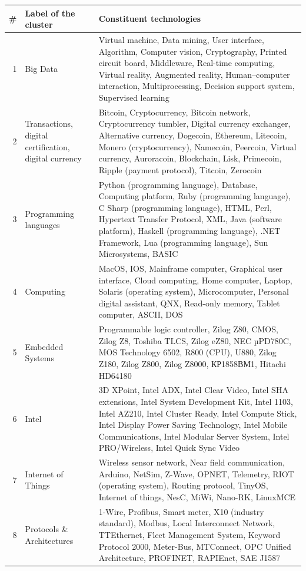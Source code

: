 \documentclass[]{book}
\begin{document}
\begin{tabular}{r|l|l}
\hline
\# & Label of the cluster & Constituent technologies\\
\hline
1 & Big Data & Virtual machine, Data mining, User interface, Algorithm, Computer vision, Cryptography, Printed circuit board, Middleware, Real-time computing, Virtual reality, Augmented reality, Human–computer interaction, Multiprocessing, Decision support system, Supervised learning\\
\hline
2 & Transactions, digital certification, digital currency & Bitcoin, Cryptocurrency, Bitcoin network, Cryptocurrency tumbler, Digital currency exchanger, Alternative currency, Dogecoin, Ethereum, Litecoin, Monero (cryptocurrency), Namecoin, Peercoin, Virtual currency, Auroracoin, Blockchain, Lisk, Primecoin, Ripple (payment protocol), Titcoin, Zerocoin\\
\hline
3 & Programming languages & Python (programming language), Database, Computing platform, Ruby (programming language), C Sharp (programming language), HTML, Perl, Hypertext Transfer Protocol, XML, Java (software platform), Haskell (programming language), .NET Framework, Lua (programming language), Sun Microsystems, BASIC\\
\hline
4 & Computing & MacOS, IOS, Mainframe computer, Graphical user interface, Cloud computing, Home computer, Laptop, Solaris (operating system), Microcomputer, Personal digital assistant, QNX, Read-only memory, Tablet computer, ASCII, DOS\\
\hline
5 & Embedded Systems & Programmable logic controller, Zilog Z80, CMOS, Zilog Z8, Toshiba TLCS, Zilog eZ80, NEC µPD780C, MOS Technology 6502, R800 (CPU), U880, Zilog Z180, Zilog Z800, Zilog Z8000, КР1858ВМ1, Hitachi HD64180\\
\hline
6 & Intel & 3D XPoint, Intel ADX, Intel Clear Video, Intel SHA extensions, Intel System Development Kit, Intel 1103, Intel AZ210, Intel Cluster Ready, Intel Compute Stick, Intel Display Power Saving Technology, Intel Mobile Communications, Intel Modular Server System, Intel PRO/Wireless, Intel Quick Sync Video\\
\hline
7 & Internet of Things & Wireless sensor network, Near field communication, Arduino, NetSim, Z-Wave, OPNET, Telemetry, RIOT (operating system), Routing protocol, TinyOS, Internet of things, NesC, MiWi, Nano-RK, LinuxMCE\\
\hline
8 & Protocols \& Architectures & 1-Wire, Profibus, Smart meter, X10 (industry standard), Modbus, Local Interconnect Network, TTEthernet, Fleet Management System, Keyword Protocol 2000, Meter-Bus, MTConnect, OPC Unified Architecture, PROFINET, RAPIEnet, SAE J1587\\

\end{tabular}
\end{document}
